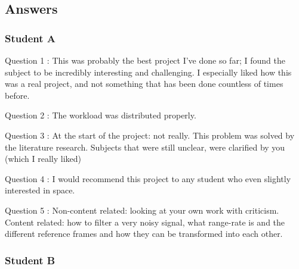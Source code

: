 \documentclass[11pt,a4paper,oneside]{article}
\newcommand{\listskip}{0pt}
\newenvironment{description*}
{\begin{description}
  \setlength{\itemsep}{\listskip}
  \setlength{\parskip}{\listskip}
  \setlength{\parsep}{\listskip}}
{\end{description}}
\begin{document}
\subsection{Answers}


\subsubsection{Student A}

\begin{description*}
\item[Question 1]: This was probably the best project I've done so far; I found the subject to be incredibly interesting and challenging. I especially liked how this was a real project, and not something that has been done countless of times before.
\item[Question 2]: The workload was distributed properly.
\item[Question 3]: At the start of the project: not really. This problem was solved by the literature research. Subjects that were still unclear, were clarified by you (which I really liked)
\item[Question 4]: I would recommend this project to any student who even slightly interested in space.
\item[Question 5]: Non-content related: looking at your own work with criticism. Content related: how to filter a very noisy signal, what range-rate is and the different reference frames and how they can be transformed into each other.
\end{description*}

\subsubsection{Student B}
\end{document}
